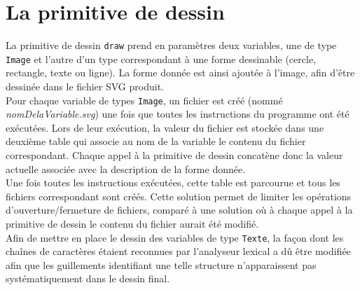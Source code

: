 \documentclass[a4paper, 12pt]{report}
\begin{document}
	\section{La primitive de dessin}
	
	La primitive de dessin \texttt{draw} prend en paramètres deux variables, une de type \texttt{Image} et l'autre d'un type correspondant à une forme dessinable (cercle, rectangle, texte ou ligne). La forme donnée est ainsi ajoutée à l'image, afin d'être dessinée dans le fichier SVG produit.\\
	
	Pour chaque variable de types \texttt{Image}, un fichier est créé (nommé \textit{nomDelaVariable.svg}) une fois que toutes les instructions du programme ont été exécutées. Lors de leur exécution, la valeur du fichier est stockée dans une deuxième table qui associe au nom de la variable le contenu du fichier correspondant. Chaque appel à la primitive de dessin concatène donc la valeur actuelle associée avec la description de la forme donnée.\\
	
	Une fois toutes les instructions exécutées, cette table est parcourue et tous les fichiers correspondant sont créés. Cette solution permet de limiter les opérations d'ouverture/fermeture de fichiers, comparé à une solution où à chaque appel à la primitive de dessin le contenu du fichier aurait été modifié.\\
	
	Afin de mettre en place le dessin des variables de type \texttt{Texte}, la façon dont les chaînes de caractères étaient reconnues par l'analyseur lexical a dû être modifiée afin que les guillements identifiant une telle structure n'apparaissent pas systématiquement dans le dessin final.
\end{document}
